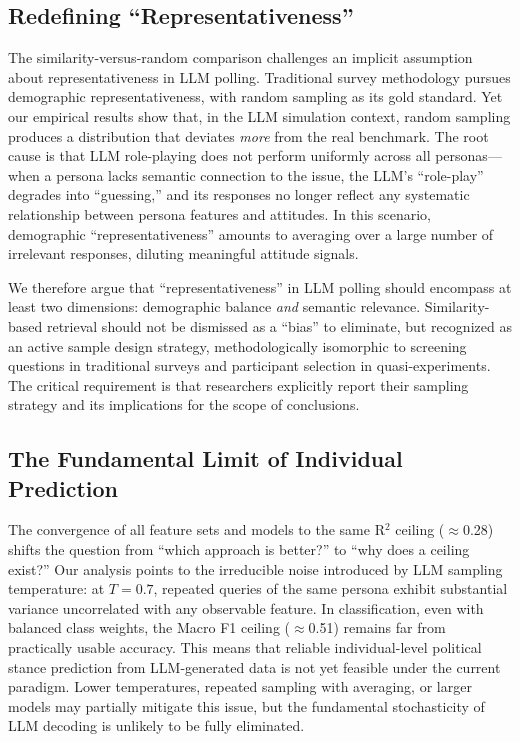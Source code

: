 \documentclass[11pt,a4paper]{article}
\begin{document}
\subsection{Redefining ``Representativeness''}

The similarity-versus-random comparison challenges an implicit assumption about representativeness in LLM polling. Traditional survey methodology pursues demographic representativeness, with random sampling as its gold standard. Yet our empirical results show that, in the LLM simulation context, random sampling produces a distribution that deviates \textit{more} from the real benchmark. The root cause is that LLM role-playing does not perform uniformly across all personas---when a persona lacks semantic connection to the issue, the LLM's ``role-play'' degrades into ``guessing,'' and its responses no longer reflect any systematic relationship between persona features and attitudes. In this scenario, demographic ``representativeness'' amounts to averaging over a large number of irrelevant responses, diluting meaningful attitude signals.

We therefore argue that ``representativeness'' in LLM polling should encompass at least two dimensions: demographic balance \textit{and} semantic relevance. Similarity-based retrieval should not be dismissed as a ``bias'' to eliminate, but recognized as an active sample design strategy, methodologically isomorphic to screening questions in traditional surveys and participant selection in quasi-experiments. The critical requirement is that researchers explicitly report their sampling strategy and its implications for the scope of conclusions.

\subsection{The Fundamental Limit of Individual Prediction}

The convergence of all feature sets and models to the same R$^2$ ceiling ($\approx$0.28) shifts the question from ``which approach is better?'' to ``why does a ceiling exist?'' Our analysis points to the irreducible noise introduced by LLM sampling temperature: at $T=0.7$, repeated queries of the same persona exhibit substantial variance uncorrelated with any observable feature. In classification, even with balanced class weights, the Macro F1 ceiling ($\approx$0.51) remains far from practically usable accuracy. This means that reliable individual-level political stance prediction from LLM-generated data is not yet feasible under the current paradigm. Lower temperatures, repeated sampling with averaging, or larger models may partially mitigate this issue, but the fundamental stochasticity of LLM decoding is unlikely to be fully eliminated.
\end{document}
